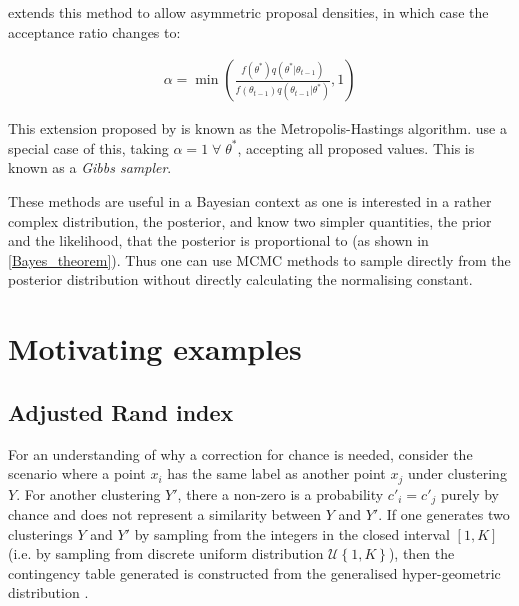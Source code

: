 \documentclass[14pt]{extarticle} %
\begin{document}
\citet{HastingsMonteCarloSampling} extends this method to allow asymmetric proposal densities, in which case the acceptance ratio changes to:

\begin{align} \label{metropolis_hastings_alpha}
\alpha = \min\left(\frac{f(\theta^*) q(\theta^*|\theta_{t-1})}{f(\theta_{t-1})q(\theta_{t-1}|\theta^*)}, 1\right)
\end{align}

This extension proposed by \citet{HastingsMonteCarloSampling} is known as the Metropolis-Hastings algorithm. \citet{GemanStochasticRelaxationGibbs1984} use a special case of this, taking $\alpha = 1 \; \forall \; \theta^*$, accepting all proposed values. This is known as a \emph{Gibbs sampler}.

These methods are useful in a Bayesian context as one is interested in a rather complex distribution, the posterior, and know two simpler quantities, the prior and the likelihood, that the posterior is proportional to (as shown in \eqref{Bayes_theorem}). Thus one can use MCMC methods to sample directly from the posterior distribution without directly calculating the normalising constant.

\section{Motivating examples}


\subsection{Adjusted Rand index} \label{sec:motivating_example_adjusted_rand_index}
For an understanding of why a correction for chance is needed, consider the scenario where a point $x_i$ has the same label as another point $x_j$ under clustering $Y$. For another clustering $Y'$, there a non-zero is a probability $c'_i=c'_j$ purely by chance and does not represent a similarity between $Y$ and $Y'$. If one generates two clusterings $Y$ and $Y'$ by sampling from the integers in the closed interval $[1,K]$ (i.e. by sampling from discrete uniform distribution $\mathcal{U}\left\{1,K\right\}$), then the contingency table generated is constructed from the generalised hyper-geometric distribution \citep{HubertComparingpartitions1985}. 
\end{document}
